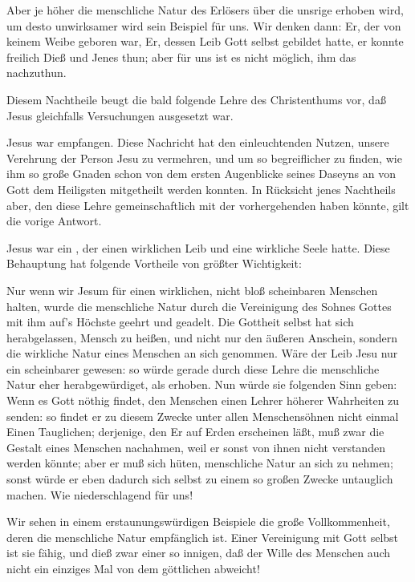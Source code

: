 \begin{aufza}
\begin{aufzb}
\end{aufzb}\par
{} Aber je höher die menschliche Natur des Erlösers über die unsrige erhoben wird, um desto unwirksamer wird sein Beispiel für uns. Wir denken dann: Er, der von keinem Weibe geboren war, Er, dessen Leib Gott selbst gebildet hatte, er konnte freilich Dieß und Jenes thun; aber für uns ist es nicht möglich, ihm das nachzuthun.\par
{} Diesem Nachtheile beugt die bald folgende Lehre des Christenthums vor, daß Jesus gleichfalls Versuchungen ausgesetzt war.~\par
\item Jesus war  empfangen. Diese Nachricht hat den einleuchtenden Nutzen, unsere Verehrung der Person Jesu zu vermehren, und um so begreiflicher zu finden, wie ihm so große Gnaden schon von dem ersten Augenblicke seines Daseyns an von Gott dem Heiligsten mitgetheilt werden konnten. In Rücksicht jenes Nachtheils aber, den diese Lehre gemeinschaftlich mit der vorhergehenden haben könnte, gilt die vorige Antwort.
\item Jesus war ein , der einen wirklichen Leib und eine wirkliche Seele hatte. Diese Behauptung hat folgende Vortheile von größter Wichtigkeit:
\begin{aufzb}
\item Nur wenn wir Jesum für einen wirklichen, nicht bloß scheinbaren Menschen halten, wurde die menschliche Natur durch die Vereinigung des Sohnes Gottes mit ihm auf's Höchste geehrt und geadelt. Die Gottheit selbst hat sich herabgelassen, Mensch zu heißen, und nicht nur den äußeren Anschein, sondern die wirkliche Natur eines Menschen an sich genommen. Wäre der Leib Jesu nur ein scheinbarer gewesen: so würde gerade durch diese Lehre die menschliche Natur eher herabgewürdiget, als erhoben. Nun würde sie folgenden Sinn geben: Wenn es Gott nöthig findet, den Menschen einen Lehrer höherer Wahrheiten zu senden: so findet er zu diesem Zwecke unter allen Menschensöhnen nicht einmal Einen Tauglichen; derjenige, den Er auf Erden erscheinen läßt, muß zwar die Gestalt eines Menschen nachahmen, weil er sonst von ihnen nicht verstanden werden könnte; aber er muß sich hüten, menschliche Natur an sich zu nehmen; sonst würde er eben dadurch sich selbst zu einem so großen Zwecke untauglich machen. Wie niederschlagend für uns!
\item Wir sehen in einem erstaunungswürdigen Beispiele die große Vollkommenheit, deren die menschliche Natur empfänglich ist. Einer Vereinigung mit Gott selbst ist sie fähig, und dieß zwar einer so innigen, daß der Wille des Menschen auch nicht ein einziges Mal von dem göttlichen abweicht!

\end{aufzb}
\end{aufza}
